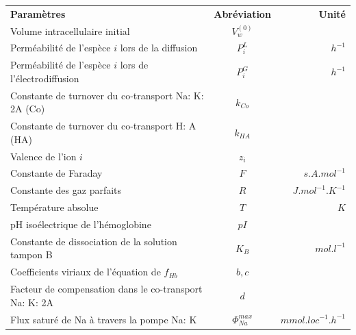 \documentclass[a4paper,fleqn]{article}
\begin{document}



\begin{tabular}{p{8cm}cr}

\textbf{Paramètres}                                             & \textbf{Abréviation}     & \textbf{Unité}      \\
Volume intracellulaire initial                                 & $V_{w}^{\left(0\right)}$                       \\
Perméabilité de l'espèce $i$ lors de la diffusion                  & $P_{i}^{L}$              & $h^{-1}$            \\
Perméabilité de l'espèce $i$ lors de l'électrodiffusion            & $P_{i}^{G}$              & $h^{-1}$            \\
Constante de turnover du co-transport Na: K: 2A (Co)            & $k_{Co}$                                       \\
Constante de turnover du co-transport H: A (HA)                 & $k_{HA}$                                       \\
Valence de l'ion $i$                                             & $z_i$                                          \\
Constante de Faraday                                           & $F$                      & $s.A.mol^{-1}$      \\
Constante des gaz parfaits                                     & $R$                      & $J.mol^{-1}.K^{-1}$ \\
Température absolue                                            & $T$                      & $K$                 \\
pH isoélectrique de l'hémoglobine                              & $pI$                                           \\
Constante de dissociation de la solution tampon B              & $K_B$                    & $mol.l^{-1}$        \\
Coefficients viriaux de l'équation de $f_{Hb}$                 & $b, c$                   &                     \\
Facteur de compensation dans le co-transport Na: K: 2A          & $d$                      &                     \\
Flux saturé de Na à travers la pompe Na: K                   & $\Phi^{max}_{Na}$        & $mmol.loc^{-1}.h^{-1}$ \\

\end{tabular}\\
\\
\end{document}
